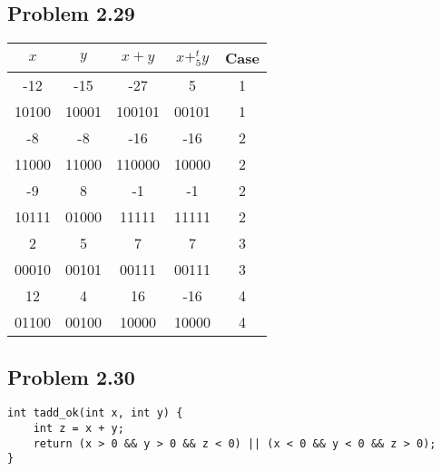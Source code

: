 \documentclass[a4paper]{article}
\begin{document}
\subsection*{Problem 2.29}
\begin{tabular}{ccccc}
    $x$&$y$&$x+y$&$x+^t_5y$&Case\\
    \hline
    -12&-15&-27&5&1\\
    10100&10001&100101&00101&1\\
    -8&-8&-16&-16&2\\
    11000&11000&110000&10000&2\\
    -9&8&-1&-1&2\\
    10111&01000&11111&11111&2\\
    2&5&7&7&3\\
    00010&00101&00111&00111&3\\
    12&4&16&-16&4\\
    01100&00100&10000&10000&4
\end{tabular}

\subsection*{Problem 2.30}
\begin{lstlisting}
int tadd_ok(int x, int y) {
    int z = x + y;
    return (x > 0 && y > 0 && z < 0) || (x < 0 && y < 0 && z > 0);
}
\end{lstlisting}
\end{document}
